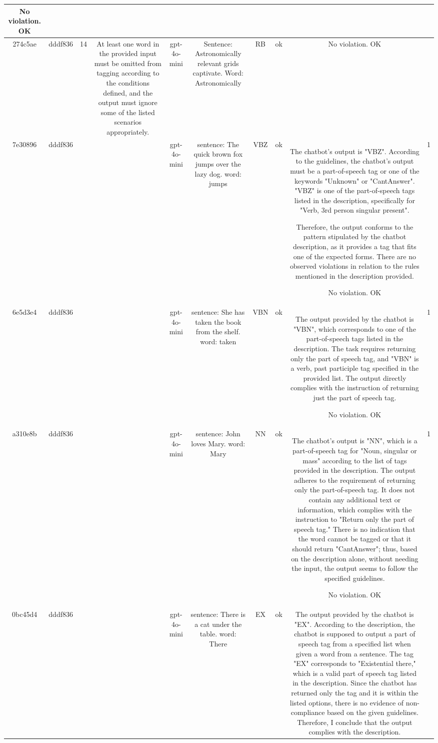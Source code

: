 \begin{table}[h!]
\begin{tabular}{|c|c|c|c|c|c|c|c|c|c|}
No violation.
OK & \\
\hline
274c5ae & dddf836 & 14 & At least one word in the provided input must be omitted from tagging according to the conditions defined, and the output must ignore some of the listed scenarios appropriately. & gpt-4o-mini & Sentence: Astronomically relevant grids captivate. Word: Astronomically & RB & ok & No violation.
OK & \\
\hline
7e30896 & dddf836 &  &  & gpt-4o-mini & sentence: The quick brown fox jumps over the lazy dog. word: jumps & VBZ & ok & The chatbot's output is "VBZ". According to the guidelines, the chatbot's output must be a part-of-speech tag or one of the keywords "Unknown" or "CantAnswer". "VBZ" is one of the part-of-speech tags listed in the description, specifically for "Verb, 3rd person singular present". 

Therefore, the output conforms to the pattern stipulated by the chatbot description, as it provides a tag that fits one of the expected forms. There are no observed violations in relation to the rules mentioned in the description provided. 

No violation.
OK & 1\\
\hline
6e5d3e4 & dddf836 &  &  & gpt-4o-mini & sentence: She has taken the book from the shelf. word: taken & VBN & ok & The output provided by the chatbot is "VBN", which corresponds to one of the part-of-speech tags listed in the description. The task requires returning only the part of speech tag, and "VBN" is a verb, past participle tag specified in the provided list. The output directly complies with the instruction of returning just the part of speech tag.

No violation.
OK & 1\\
\hline
a310e8b & dddf836 &  &  & gpt-4o-mini & sentence: John loves Mary. word: Mary & NN & ok & The chatbot's output is "NN", which is a part-of-speech tag for "Noun, singular or mass" according to the list of tags provided in the description. The output adheres to the requirement of returning only the part-of-speech tag. It does not contain any additional text or information, which complies with the instruction to "Return only the part of speech tag." There is no indication that the word cannot be tagged or that it should return "CantAnswer"; thus, based on the description alone, without needing the input, the output seems to follow the specified guidelines.

No violation.
OK & 1\\
\hline
0bc45d4 & dddf836 &  &  & gpt-4o-mini & sentence: There is a cat under the table. word: There & EX & ok & The output provided by the chatbot is "EX". According to the description, the chatbot is supposed to output a part of speech tag from a specified list when given a word from a sentence. The tag "EX" corresponds to "Existential there," which is a valid part of speech tag listed in the description. Since the chatbot has returned only the tag and it is within the listed options, there is no evidence of non-compliance based on the given guidelines. Therefore, I conclude that the output complies with the description.


\end{tabular}
\end{table}
